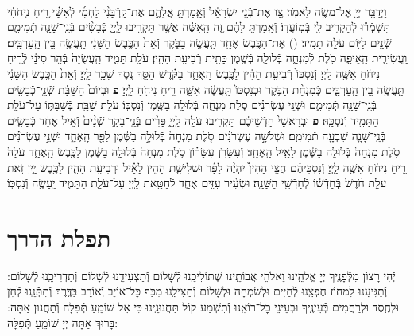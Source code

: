 \documentclass[twoside, openany, parskip=half, 11pt]{book}
\begin{document}
\begin{footnotesize}
\begin{multicols}{2}
\\
וַיְדַבֵּ֥ר יְיָ֖ אֶל־משֶׂ֥ה לֵּאמֹֽר׃ צַ֚ו אֶת־בְּֿֿנֵ֣י יִשְׂרָאֵ֔ל וְֿאָֽמַרְתָּ֖ אֲלֵהֶ֑ם אֶת־קָרְֿבָּנִ֨י לַחְמִ֜י לְֿאִשַּׁ֗י רֵ֚יחַ נִֽיחֹחִ֔י תִּשְׁמְֿר֕וּ לְֿהַקְרִ֥יב לִ֖י בְּֿמֽוֹעֲדֽוֹ׃
וְֿאָֽמַרְתָּ֣ לָהֶ֔ם זֶ֚ה הָֽאִשֶּׁ֔ה אֲשֶׁ֥ר תַּקְרִ֖יבוּ לַֽיְיָ֑ כְּֿבָשִׂ֨ים בְּֿנֵֽי־שָׁנָ֧ה תְֿמִימִ֛ם שְֿׁנַ֥יִם לַיּ֖וֹם עֹלָ֥ה תָמִֽיד׃
()
אֶת־הַכֶּ֥בֶשׂ אֶחָ֖ד תַּֽעֲשֶׂ֣ה בַבֹּ֑קֶר וְֿאֵת֙ הַכֶּ֣בֶשׂ הַשֵּׁנִ֔י תַּֽעֲשֶׂ֖ה בֵּ֥ין הָֽעַרְבָּֽיִם׃ וַֽעֲשִׂירִ֧ית הָֽאֵיפָ֛ה סֹ֖לֶת לְֿמִנְחָ֑ה בְּֿלוּלָ֛ה בְּֿשֶׁ֥מֶן כָּתִ֖ית רְֿבִיעִ֥ת הַהִֽין׃
עֹלַ֖ת תָּמִ֑יד הָֽעֲשֻׂיָה֙ בְּֿהַ֣ר סִינַ֔י לְֿרֵ֣יחַ נִיחֹ֔חַ אִשֶּׁ֖ה לַֽיְיָ׃ וְֿנִסְכּוֹ֙ רְֿבִיעִ֥ת הַהִ֔ין לַכֶּ֖בֶשׂ הָֽאֶחָ֑ד בַּקֹּ֗דֶשׁ הַסֵּ֛ךְ נֶ֥סֶךְ שֵׁכָ֖ר לַֽיְיָ׃ וְֿאֵת֙ הַכֶּ֣בֶשׂ הַשֵּׁנִ֔י תַּֽעֲשֶׂ֖ה בֵּ֣ין הָֽעַרְבָּ֑יִם כְּֿמִנְחַ֨ת הַבֹּ֤קֶר וּכְנִסְכּוֹ֙ תַּֽעֲשֶׂ֔ה אִשֵּׁ֛ה רֵ֥יחַ נִיחֹ֖חַ לַֽיְיָ׃ \textbf{פ}
וּבְיוֹם֙ הַשַּׁבָּ֔ת שְֿׁנֵֽי־כְֿֿבָשִׂ֥ים בְּֿנֵֽי־שָׁנָ֖ה תְּֿמִימִ֑ם וּשְׁנֵ֣י עֶשְׂרֹנִ֗ים סֹ֧לֶת מִנְחָ֛ה בְּֿלוּלָ֥ה בַשֶּׁ֖מֶן וְֿנִסְכּֽוֹ׃ עֹלַ֥ת שַׁבַּ֖ת בְּֿשַׁבַּתּ֑וֹ עַל־עֹלַ֥ת הַתָּמִ֖יד וְֿנִסְכָּֽהּ׃ \textbf{פ}
וּבְרָאשֵׁי֙ חָדְֿשֵׁיכֶ֔ם תַּקְרִ֥יבוּ עֹלָ֥ה לַֽיְיָ֑ פָּרִ֨ים בְּֿנֵֽי־בָקָ֤ר שְֿׁנַ֨יִם֙ וְֿאַ֣יִל אֶחָ֔ד כְּֿבָשִׂ֧ים בְּֿנֵֽי־שָׁנָ֛ה שִׁבְעָ֖ה תְּֿמִימִֽם׃ וּשְׁלֹשָׁ֣ה עֶשְׂרֹנִ֗ים סֹ֤לֶת מִנְחָה֙ בְּֿלוּלָ֣ה בַשֶּׁ֔מֶן לַפָּ֖ר הָֽאֶחָ֑ד וּשְׁנֵ֣י עֶשְׂרֹנִ֗ים סֹ֤לֶת מִנְחָה֙ בְּֿלוּלָ֣ה בַשֶּׁ֔מֶן לָאַ֖יִל הָֽאֶחָֽד׃ וְֿעִשָּׂרֹ֣ן עִשָּׂר֗וֹן סֹ֤לֶת מִנְחָה֙ בְּֿלוּלָ֣ה בַשֶּׁ֔מֶן לַכֶּ֖בֶשׂ הָֽאֶחָ֑ד עֹלָה֙ רֵ֣יחַ נִיחֹ֔חַ אִשֶּׁ֖ה לַֽיְיָ׃ וְֿנִסְכֵּיהֶ֗ם חֲצִ֣י הַהִין֩ יִהְיֶ֨ה לַפָּ֜ר וּשְׁלִישִׁ֧ת הַהִ֣ין לָאַ֗יִל וּרְבִיעִ֥ת הַהִ֛ין לַכֶּ֖בֶשׂ יָ֑יִן זֹ֣את עֹלַ֥ת חֹ֨דֶשׁ֙ בְּֿחָדְֿשׁ֔וֹ לְֿחָדְֿשֵׁ֖י הַשָּׁנָֽה׃ וּשְׂעִ֨יר עִזִּ֥ים אֶחָ֛ד לְֿחַטָּ֖את לַֽיְיָ עַל־עֹלַ֧ת הַתָּמִ֛יד יֵֽעָשֶׂ֖ה וְֿנִסְכּֽוֹ׃

\end{multicols}

\end{footnotesize}

\chapter{תפלת הדרך}

יְֿהִי רָצוֹן מִלְּֿפָנֶֽיךָ יְיָ אֱלֹהֵֽינוּ וֵאלֹהֵי אֲבוֹתֵֽינוּ שֶׁתּוֹלִיכֵֽנוּ לְֿשָׁלוֹם וְֿתַצְעִידֵֽנוּ לְֿשָׁלוֹם וְֿתַדְרִיכֵֽנוּ לְֿשָׁלוֹם: וְֿתַגִּיעֵֽנוּ לִמְחוֹז חֶפְצֵֽנוּ לְֿחַיִּים וּלְשִׂמְחָה וּלְשָׁלוֹם וְֿתַצִּילֵֽנוּ מִכַּף כׇּל־אוֹיֵב וְֿאוֹרֵב בַּדֶּֽרֶךְ וְֿתִתְּֿנֵֽנוּ לְֿחֵן וּלְחֶֽסֶד וּלְרַחֲמִים בְּֿעֵינֶֽיךָ וּבְעֵינֵי כׇל־רוֹאֵֽנוּ וְֿתִשְׁמַע קוֹל תַּחֲנוּנֵֽינוּ כִּי אֵל שׁוֹמֵֽעַ תְּֿפִלָה וְֿתַחֲנוּן אַֽתָּה: בָּרוּךְ אַתָּה יְיָ שׁוֹמֵֽעַ תְּֿפִלָּה:\\

\clearpage

\blankpage
\end{document}
